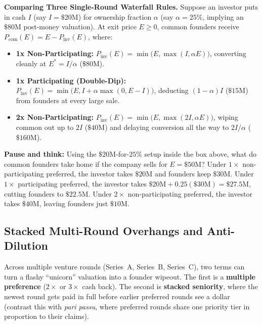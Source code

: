 \begin{formalbox}
\textbf{Comparing Three Single-Round Waterfall Rules.}
Suppose an investor puts in cash $I$ (say $I = \$20\text{M}$) for ownership fraction $\alpha$ (say $\alpha = 25\%$, implying an $\$80\text{M}$ post-money valuation). At exit price $E \ge 0$, common founders receive $P_{\text{com}}(E) = E - P_{\text{inv}}(E)$, where:
\begin{itemize}
  \item \textbf{1x Non-Participating:} $P_{\text{inv}}(E) = \min\bigl(E, \max(I, \alpha E)\bigr)$, converting cleanly at $E^* = I/\alpha$ ($\$80\text{M}$).
  \item \textbf{1x Participating (Double-Dip):} $P_{\text{inv}}(E) = \min\bigl(E, I + \alpha\max(0, E - I)\bigr)$, deducting $(1-\alpha)I$ ($\$15\text{M}$) from founders at every large sale.
  \item \textbf{2x Non-Participating:} $P_{\text{inv}}(E) = \min\bigl(E, \max(2I, \alpha E)\bigr)$, wiping common out up to $2I$ ($\$40\text{M}$) and delaying conversion all the way to $2I/\alpha$ ($\$160\text{M}$).
\end{itemize}
\end{formalbox}

\begin{recoverybox}
\textbf{Pause and think:} Using the $\$20\text{M}$-for-$25\%$ setup inside the box above, what do common founders take home if the company sells for $E = \$50\text{M}$? Under $1\times$ non-participating preferred, the investor takes $\$20\text{M}$ and founders keep $\$30\text{M}$. Under $1\times$ participating preferred, the investor takes $\$20\text{M} + 0.25(\$30\text{M}) = \$27.5\text{M}$, cutting founders to $\$22.5\text{M}$. Under $2\times$ non-participating preferred, the investor takes $\$40\text{M}$, leaving founders just $\$10\text{M}$.
\end{recoverybox}

\subsection{Stacked Multi-Round Overhangs and Anti-Dilution}
\label{subsec:multiple-preferences-seniority}

Across multiple venture rounds (Series~A, Series~B, Series~C), two terms can turn a flashy ``unicorn'' valuation into a founder wipeout. The first is a \textbf{multiple preference} ($2\times$ or $3\times$ cash back). The second is \textbf{stacked seniority}, where the newest round gets paid in full before earlier preferred rounds see a dollar (contrast this with \emph{pari passu}, where preferred rounds share one priority tier in proportion to their claims).

